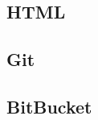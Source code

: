 \documentclass{beamer}
\begin{document}
\begin{frame}
\section{HTML}
\end{frame}
\begin{frame}
\section{Git}
\end{frame}
\begin{frame}
\section{BitBucket}
\end{frame}
\end{document}

